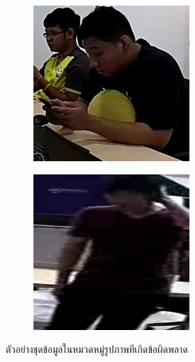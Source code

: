 \begin{figure}[!ht]
\begin{subfigure}[b]{0.45\linewidth}
    \end{subfigure}
    \begin{subfigure}[b]{0.45\linewidth}
      \includegraphics[width=\linewidth]{appendix/unknown/000_CXS0_D0_001794.jpg}
    \end{subfigure}
    \begin{subfigure}[b]{0.45\linewidth}
      \includegraphics[width=\linewidth]{appendix/unknown/001_CXS2_D1_001979.jpg}
    \end{subfigure}
    \caption{ตัวอย่างชุดข้อมูลในหมวดหมู่รูปภาพทีเกิดข้อผิดพลาด}
    \label{fig:result_track}
 \end{figure}


